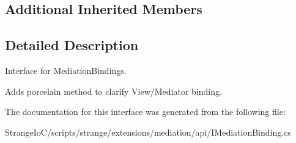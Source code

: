 \subsection*{Additional Inherited Members}


\subsection{Detailed Description}
Interface for Mediation\-Bindings. 

Adds porcelain method to clarify View/\-Mediator binding. 

The documentation for this interface was generated from the following file\-:\begin{DoxyCompactItemize}
\item 
Strange\-Io\-C/scripts/strange/extensions/mediation/api/I\-Mediation\-Binding.\-cs\end{DoxyCompactItemize}
